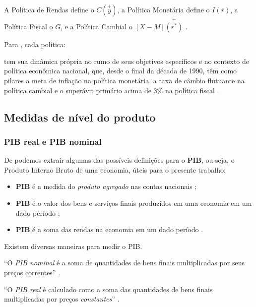 \documentclass[
	10pt,				%
	openright,			%
	twoside,			%
	a5paper,			%
	english,			%
	french,				%
	spanish,			%
	brazil				%
	]{abntex2}
\renewenvironment{quote}
  {\small\list{}{\rightmargin=0.1cm \leftmargin=4cm}%
   \item\relax}
  {\endlist}
\begin{document}
A Política de Rendas define o \(C(\stackrel{+}{y})\), a Política
Monetária define o \(I(\bar{r})\), a Política Fiscal o \(G\), e a
Política Cambial o \([X - M]\stackrel{+}{(r^*)}\)
\cite[p.~53]{fortuna2015}.

Para , cada política:

\begin{quote}
tem sua dinâmica própria no rumo de seus objetivos específicos e no
contexto de política econômica nacional, que, desde o final da década de
1990, têm como pilares a meta de inflação na política monetária, a taxa
de câmbio flutuante na política cambial e o superávit primário acima de
3\% na política fiscal \cite[p.~53]{fortuna2015}.
\end{quote}

\subsection{Medidas de nível do
produto}\label{medidas-de-nuxedvel-do-produto}

\subsubsection{PIB real e PIB nominal}\label{subsubsec:pib}

De  podemos extrair algumas das possíveis
definições para o \textbf{PIB}, ou seja, o Produto Interno Bruto de uma
economia, úteis para o presente trabalho:

\begin{itemize}
\tightlist
\item
  \textbf{PIB} é a medida do \emph{produto agregado} nas contas
  nacionais \cite[p.~20]{blanchard};
\item
  \textbf{PIB} é o valor dos bens e serviços finais produzidos em uma
  economia em um dado período \cite[p.~21]{blanchard};
\item
  \textbf{PIB} é a soma das rendas na economia em um dado período
  \cite[p.~21]{blanchard}.
\end{itemize}

Existem diversas maneiras para medir o PIB.

``O \emph{PIB nominal} é a soma de quantidades de bens finais
multiplicadas por seus preços correntes'' \cite[p.~22]{blanchard}.

``O \emph{PIB real} é calculado como a soma das quantidades de bens
finais multiplicadas por preços \emph{constantes}''
\cite[p.~22]{blanchard}.
\end{document}
